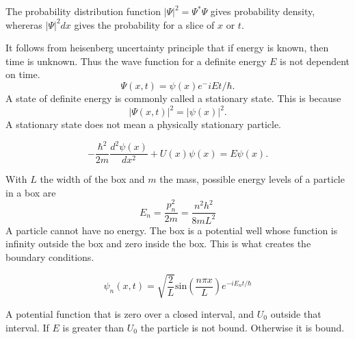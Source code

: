 \documentclass[nobib,notoc]{tufte-handout}
\begin{document}
\begin{defi}
	The probability distribution function \(\lvert \Psi\rvert^2=\Psi^*\Psi\) gives probability density, whereras \(\lvert \Psi\rvert^2dx\) gives the probability for a slice of \(x\) or \(t\).
\end{defi}
\begin{defi}
	It follows from heisenberg uncertainty principle that if energy is known, then time is unknown. Thus the wave function for a definite energy \(E\) is not dependent on time.
	\begin{equation*}
		\Psi(x,t)=\psi(x)e^-iEt/\hbar.
	\end{equation*}
	A state of definite energy is commonly called a stationary state. This is because
	\begin{equation*}
		\lvert \Psi(x,t)\rvert^2=\lvert \psi(x)\rvert^2.
	\end{equation*}
	A stationary state does not mean a physically stationary particle.
\end{defi}
\begin{defi}
	\begin{equation*}
		-\frac{\hbar^2}{2m}\frac{d^2\psi(x)}{dx^2}+U(x)\psi(x)=E\psi(x).
	\end{equation*}
\end{defi}
\begin{defi}
	With \(L\) the width of the box and \(m\) the mass, possible energy levels of a particle in a box are
	\begin{equation*}
		E_n=\frac{p_n^2}{2m}=\frac{n^2h^2}{8mL^2}
	\end{equation*}
	A particle cannot have no energy. The box is a potential well whose function is infinity outside the box and zero inside the box. This is what creates the boundary conditions.
\end{defi}
\begin{defi}
	\begin{equation*}
		\psi_n(x,t)=\sqrt{\frac{2}{L}}\text{sin}(\frac{n\pi x}{L})e^{-iE_n t/\hbar}
	\end{equation*}
\end{defi}
\begin{defi}
	A potential function that is zero over a closed interval, and \(U_0\) outside that interval. If \(E\) is greater than \(U_0\) the particle is not bound. Otherwise it is bound.
\end{defi}
\end{document}
